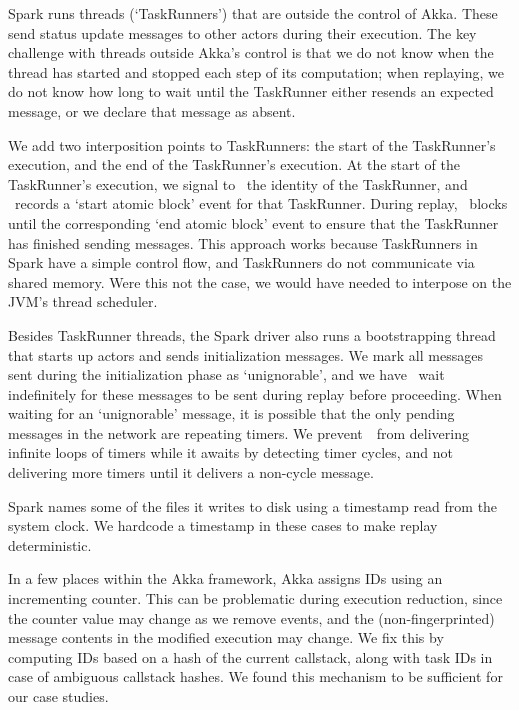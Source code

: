 Spark runs threads (`TaskRunners') that are outside the control of
Akka. These send status
update messages to other actors during their execution.
The key challenge with threads outside Akka's control is that we do not know
when the thread has started and stopped each step of its computation;
when replaying, we do not know how long to wait until the TaskRunner either resends
an expected message, or we declare that message as absent.

We add two interposition points to TaskRunners:
the start of the
TaskRunner's execution, and the end of the TaskRunner's execution.
At the start of the TaskRunner's execution, we signal to \sys~the identity of the TaskRunner,
and \sys~records a `start atomic block' event for that TaskRunner. During
replay, \sys~blocks until the corresponding `end atomic block' event to ensure
that the TaskRunner has finished sending messages. This approach
works because TaskRunners in
Spark have a simple control flow, and TaskRunners do not communicate via shared memory. Were this
not the case, we would have needed to interpose on the JVM's thread scheduler.


Besides
TaskRunner threads, the Spark driver also runs a bootstrapping thread
that starts up actors
and sends initialization messages. We mark all
messages sent during the initialization phase as `unignorable', and we have
\sys~wait indefinitely for these messages to be sent during
replay before proceeding. When waiting for an `unignorable'
message, it is possible that the only pending messages in the network are
repeating timers. We
prevent~\sys~from delivering infinite loops of timers while it awaits
by detecting timer cycles, and not delivering more timers until it delivers
a non-cycle message.

Spark names some of the files it writes to disk using a timestamp read from the system clock.
We hardcode a timestamp in these cases to make replay deterministic.

 In a few places within the Akka framework, Akka assigns IDs using an
incrementing counter. This can be problematic during execution reduction, since the counter value
may change as we remove events, and the (non-fingerprinted) message contents in the modified execution may change.
We fix this by computing IDs based on a hash
of the current callstack, along with task IDs in case of ambiguous callstack
hashes. We found this mechanism to be sufficient for our case studies.

